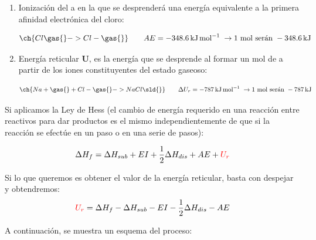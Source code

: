 \begin{enumerate}[label=\numberballmDarkTeal]
\begin{enumerate}[label=\numberballmDarkTeal]
            \begin{equation*}
                \ch{Na \gas{}  -> Na+ \gas{}} \qquad   EI = \energia[kjmol]{495.8} \rightarrow  \text{1 mol serán }  \energia[kj]{495.8}
            \end{equation*}

            \item Ionización del  a  en la que se desprenderá una energía equivalente a la primera afinidad electrónica del cloro:

            \begin{equation*}
                \ch{Cl \gas{}  -> Cl- \gas{}} \qquad   AE = \energia[kjmol]{-348.6} \rightarrow  \text{1 mol serán }  \energia[kj]{-348.6}
            \end{equation*}
            \item Energía reticular \(\bm{U}\), es la energía que se desprende al formar un mol de  a partir de los iones constituyentes del estado gaseoso:

            \begin{equation*}
                \ch{Na+ \gas{} + Cl- \gas{} -> NaCl \sld{}} \qquad  \Delta U_r = \energia[kjmol]{-787} \rightarrow \text{1 mol serán } \energia[kj]{-787}
            \end{equation*}

        \end{enumerate}

        Si aplicamos la Ley de Hess (el cambio de energía requerido en una reacción entre reactivos para dar productos es el mismo independientemente de que si la reacción se efectúe en un paso o en una serie de pasos):

        \begin{equation}
            \Delta H_{f} = \Delta H_{sub} + EI + \dfrac{1}{2} \Delta H_{dis} + AE + {\color {red} U_r}
        \end{equation}

        Si lo que queremos es obtener el valor de la energía reticular, basta con despejar y obtendremos:
        \begin{equation}
            {\color {red} U_r}
            = \Delta H_{f} - \Delta H_{sub} - EI - \dfrac{1}{2} \Delta H_{dis} - AE
        \end{equation}

        A continuación, se muestra un esquema del proceso:



\end{enumerate}
